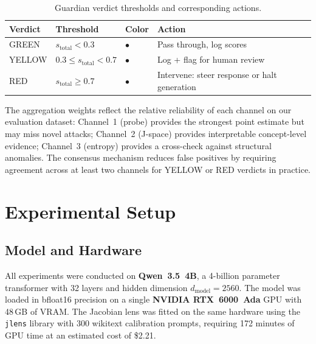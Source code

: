 \documentclass[11pt]{article}
\begin{document}
\begin{table}[H]
\centering
\caption{Guardian verdict thresholds and corresponding actions.}
\label{tab:verdicts}
\begin{tabular}{llll}
\toprule
\textbf{Verdict} & \textbf{Threshold} & \textbf{Color} & \textbf{Action} \\
\midrule
GREEN   & $s_{\text{total}} < 0.3$     & {\color{greenverd}\(\bullet\)} & Pass through, log scores \\
YELLOW  & $0.3 \leq s_{\text{total}} < 0.7$ & {\color{yellowverd}\(\bullet\)} & Log + flag for human review \\
RED     & $s_{\text{total}} \geq 0.7$  & {\color{redverd}\(\bullet\)}   & Intervene: steer response or halt generation \\
\bottomrule
\end{tabular}
\end{table}

The aggregation weights reflect the relative reliability of each channel on our evaluation dataset: Channel~1 (probe) provides the strongest point estimate but may miss novel attacks; Channel~2 (J-space) provides interpretable concept-level evidence; Channel~3 (entropy) provides a cross-check against structural anomalies. The consensus mechanism reduces false positives by requiring agreement across at least two channels for YELLOW or RED verdicts in practice.

\section{Experimental Setup}
\label{sec:setup}

\subsection{Model and Hardware}

All experiments were conducted on \textbf{Qwen~3.5~4B}, a 4-billion parameter transformer with 32 layers and hidden dimension $d_{\text{model}} = 2560$. The model was loaded in bfloat16 precision on a single \textbf{NVIDIA RTX~6000~Ada} GPU with 48\,GB of VRAM. The Jacobian lens was fitted on the same hardware using the \texttt{jlens} library with 300 wikitext calibration prompts, requiring 172 minutes of GPU time at an estimated cost of \$2.21.
\end{document}
